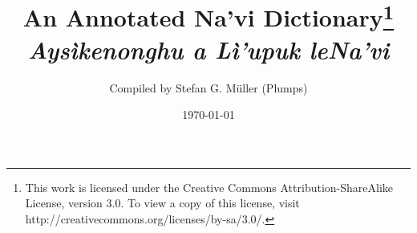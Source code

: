 \documentclass[a4paper,11pt]{report}
\newcommand{\B}[1]{\textbf{#1}}
\newcommand{\I}[1]{\textipa{#1}}
\newcommand{\on}[1]{\oldstylenums{#1}}
\newcommand{\LINK}[2]{{\color{blue}\href{#1}{\textsc{#2}}}}
\newcommand{\cp}[1]{{\color{Plum}{#1}}}
\newcommand{\HT}[2]{\hypertarget{#1}{#2}}
\newcommand{\HL}[2]{\hyperlink{#1}{#2}}
\begin{document}
\title{\B{An Annotated Na'vi Dictionary}\footnote{This work is licensed under the Creative Commons Attribution-ShareAlike License, version 3.0. To view a copy of this license, visit http://creativecommons.org/licenses/by-sa/3.0/.} \\
\emph{Aysìkenonghu a Lì'upuk leNa'vi}}  		
\author{Compiled by Stefan G. M\"uller (Plumps)}

\date{\today}

\maketitle



% 
 
% 
 


% 


% 



 
 






 
\end{document}
